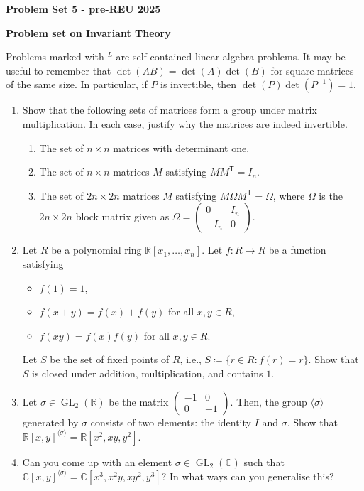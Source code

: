 \documentclass{article}
\DeclareMathOperator{\GL}{GL}
\newcommand{\trans}{\mathsf{T}}
\newcommand{\halfitem}{\item[\number\numexpr\value{enumi}+0.5\relax.]}
\newcommand{\smatrix}[1]{\left(\begin{smallmatrix} #1 \end{smallmatrix}\right)}
\begin{document}
\vspace*{-2cm}
\begin{center}
\bf Problem Set 5 - pre-REU 2025
\end{center}

\noindent \textbf{Problem set on Invariant Theory}

\noindent Problems marked with ${}^{L}$ are self-contained linear algebra problems. 
It may be useful to remember that $\det(AB) = \det(A) \det(B)$ for square matrices of the same size. 
In particular, if $P$ is invertible, then $\det(P) \det(P^{-1}) = 1$. 

\begin{enumerate}[label=\arabic*., leftmargin=*]
	\item Show that the following sets of matrices form a group under matrix multiplication. 
	In each case, justify why the matrices are indeed invertible.
	\begin{enumerate}[label=(\alph*)]
		\item The set of $n \times n$ matrices with determinant one. 
		\item The set of $n \times n$ matrices $M$ satisfying 
		$M M^{\trans} = I_{n}$.
		\item The set of $2n \times 2n$ matrices $M$ satisfying 
		$M \Omega M^{\trans} = \Omega$, 
		where $\Omega$ is the $2n \times 2n$ block matrix given as 
		$\Omega = \smatrix{0 & I_{n} \\ -I_{n} & 0}$. 
	\end{enumerate}
	\item Let $R$ be a polynomial ring $\mathbb{R}[x_{1}, \ldots, x_{n}]$. 
	Let $f \colon R \to R$ be a function satisfying 
	\begin{itemize}
		\item $f(1) = 1$, 
		\item $f(x + y) = f(x) + f(y)$ for all $x, y \in R$, 
		\item $f(x y) = f(x) f(y)$ for all $x, y \in R$.
	\end{itemize}
	Let $S$ be the set of fixed points of $R$, i.e., 
	$S \coloneqq \{r \in R : f(r) = r\}$. 
	Show that $S$ is closed under addition, multiplication, and contains $1$. 
	\item Let $\sigma \in \GL_{2}(\mathbb{R})$ be the matrix $\smatrix{-1 & 0 \\ 0 & -1}$. 
	Then, the group $\langle \sigma \rangle$ generated by $\sigma$ consists of two elements: the identity $I$ and $\sigma$. 
	Show that $\mathbb{R}[x, y]^{\langle \sigma \rangle} = \mathbb{R}[x^{2}, x y, y^{2}]$.
	\halfitem Can you come up with an element $\sigma \in \GL_{2}(\mathbb{C})$ such that 
	$\mathbb{C}[x, y]^{\langle \sigma \rangle} = \mathbb{C}[x^{3}, x^{2} y, x y^{2}, y^{3}]$? \newline
	In what ways can you generalise this? 


\end{enumerate}
\end{document}
